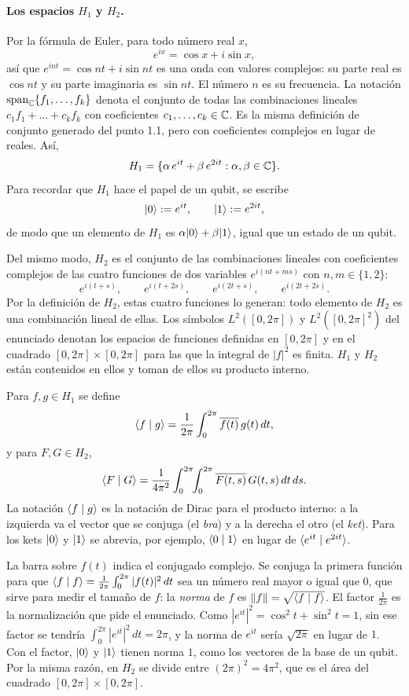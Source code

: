 \paragraph{Los espacios $H_1$ y $H_2$.} Por la fórmula de Euler, para todo número real $x$,
\[
  e^{ix}=\cos x+i\sin x ,
\]
así que $e^{int}=\cos nt+i\sin nt$ es una onda con valores complejos: su parte real es $\cos nt$ y su parte imaginaria es $\sin nt$. El número $n$ es su frecuencia. La notación $\operatorname{span}_{\mathbb C}\{f_1,\dots,f_k\}$ denota el conjunto de todas las combinaciones lineales $c_1f_1+\dots+c_kf_k$ con coeficientes $c_1,\dots,c_k\in\mathbb{C}$. Es la misma definición de conjunto generado del punto 1.1, pero con coeficientes complejos en lugar de reales. Así,
\[
  H_1=\{\alpha\,e^{it}+\beta\,e^{2it} : \alpha,\beta\in\mathbb{C}\}.
\]
Para recordar que $H_1$ hace el papel de un qubit, se escribe
\[
  \lvert 0\rangle:=e^{it},\qquad \lvert 1\rangle:=e^{2it},
\]
de modo que un elemento de $H_1$ es $\alpha\lvert 0\rangle+\beta\lvert 1\rangle$, igual que un estado de un qubit.

Del mismo modo, $H_2$ es el conjunto de las combinaciones lineales con coeficientes complejos de las cuatro funciones de dos variables $e^{i(nt+ms)}$ con $n,m\in\{1,2\}$:
\[
  e^{i(t+s)},\qquad e^{i(t+2s)},\qquad e^{i(2t+s)},\qquad e^{i(2t+2s)}.
\]
Por la definición de $H_2$, estas cuatro funciones lo generan: todo elemento de $H_2$ es una combinación lineal de ellas. Los símbolos $L^2([0,2\pi])$ y $L^2([0,2\pi]^2)$ del enunciado denotan los espacios de funciones definidas en $[0,2\pi]$ y en el cuadrado $[0,2\pi]\times[0,2\pi]$ para las que la integral de $|f|^2$ es finita. $H_1$ y $H_2$ están contenidos en ellos y toman de ellos su producto interno.

\begin{definicionT}
Para $f,g\in H_1$ se define
\[
  \langle f\mid g\rangle=\frac1{2\pi}\int_0^{2\pi}\overline{f(t)}\,g(t)\,dt ,
\]
y para $F,G\in H_2$,
\[
  \langle F\mid G\rangle=\frac1{4\pi^2}\int_0^{2\pi}\!\!\int_0^{2\pi}\overline{F(t,s)}\,G(t,s)\,dt\,ds .
\]
La notación $\langle f\mid g\rangle$ es la notación de Dirac para el producto interno: a la izquierda va el vector que se conjuga (el \emph{bra}) y a la derecha el otro (el \emph{ket}). Para los kets $\lvert 0\rangle$ y $\lvert 1\rangle$ se abrevia, por ejemplo, $\langle 0\mid 1\rangle$ en lugar de $\langle e^{it}\mid e^{2it}\rangle$.
\end{definicionT}

La barra sobre $f(t)$ indica el conjugado complejo. Se conjuga la primera función para que $\langle f\mid f\rangle=\frac1{2\pi}\int_0^{2\pi}|f(t)|^2\,dt$ sea un número real mayor o igual que $0$, que sirve para medir el tamaño de $f$: la \emph{norma} de $f$ es $\|f\|=\sqrt{\langle f\mid f\rangle}$. El factor $\frac1{2\pi}$ es la normalización que pide el enunciado. Como $|e^{it}|^2=\cos^2t+\sin^2t=1$, sin ese factor se tendría $\int_0^{2\pi}|e^{it}|^2\,dt=2\pi$, y la norma de $e^{it}$ sería $\sqrt{2\pi}$ en lugar de $1$. Con el factor, $\lvert 0\rangle$ y $\lvert 1\rangle$ tienen norma $1$, como los vectores de la base de un qubit. Por la misma razón, en $H_2$ se divide entre $(2\pi)^2=4\pi^2$, que es el área del cuadrado $[0,2\pi]\times[0,2\pi]$.

